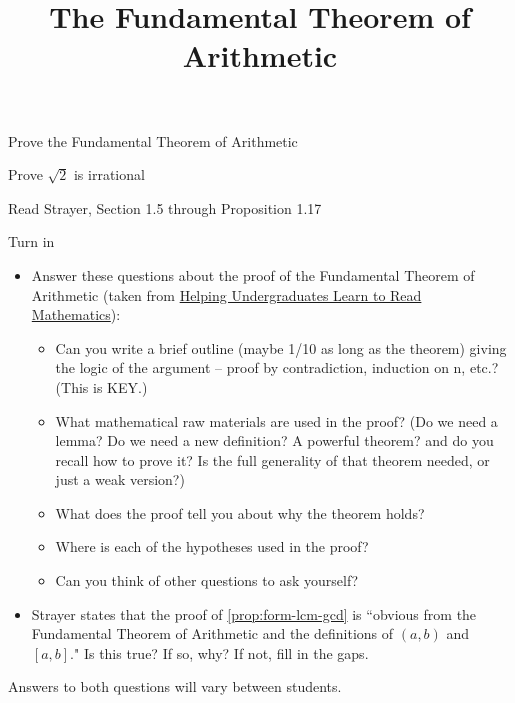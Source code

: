 \documentclass{ximera}
\title{The Fundamental Theorem of Arithmetic}
\begin{document}
\begin{abstract}
\end{abstract}
\maketitle


\begin{obj}
\item Prove the Fundamental Theorem of Arithmetic
\item  Prove $\sqrt{2}$ is irrational
\end{obj}

\begin{pre}
	\item[Read] Strayer, Section 1.5 through Proposition 1.17
	\item[Turn in] 
		\begin{itemize}
		   \item Answer these questions about the proof of the Fundamental Theorem of Arithmetic (taken from \href{https://maa.org/node/121566}{Helping Undergraduates Learn to Read Mathematics}):
		   
		   \begin{itemize}
			   \item Can you write a brief outline (maybe 1/10 as long as the theorem) giving the logic of the argument -- proof by contradiction, induction on n, etc.? (This is KEY.)
			   \item What mathematical raw materials are used in the proof? (Do we need a lemma? Do we need a new definition? A powerful theorem? and do you recall how to prove it? Is the full generality of that theorem needed, or just a weak version?)
			   \item What does the proof tell you about why the theorem holds?
			   \item Where is each of the hypotheses used in the proof?
			   \item Can you think of other questions to ask yourself?
		   \end{itemize}
	   
	\item Strayer states that the proof of \cref{prop:form-lcm-gcd} is ``obvious from the Fundamental Theorem of Arithmetic and the definitions of $(a,b)$ and $[a,b]$." Is this true? If so, why? If not, fill in the gaps.
		\end{itemize}
	   
		
	   \begin{solution}
	   Answers to both questions will vary between students.
	   \end{solution}
\end{pre}
\end{document}
